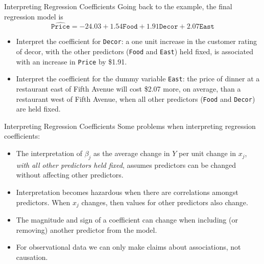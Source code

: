 \documentclass[10pt]{beamer}
\begin{document}
\begin{frame}{Interpreting Regression Coefficients}
Going back to the example, the final regression model is
$$\widehat{\texttt{Price}} = -24.03 + 1.54 \texttt{Food} + 1.91 \texttt{Decor} + 2.07\texttt{East}$$

\begin{itemize}
\item Interpret the coefficient for \texttt{Decor}: a one unit increase in the customer rating of decor, with the other predictors (\texttt{Food} and \texttt{East}) held fixed, is associated with an increase in \texttt{Price} by \$1.91.
\vspace{5pt}
\item Interpret the coefficient for the dummy variable \texttt{East}: the price of dinner at a restaurant east of Fifth Avenue will cost \$2.07 more, on average, than a restaurant west of Fifth Avenue, when all other predictors (\texttt{Food} and \texttt{Decor})  are held fixed.
\end{itemize}
\end{frame}


\begin{frame}{Interpreting Regression Coefficients}
Some problems when interpreting regression coefficients:
\vspace{5pt}
\begin{itemize}
\item The interpretation of $\beta_j$ as the average change in $Y$ per unit change in $x_j$, \emph{with all other predictors held fixed}, assumes predictors can be changed without affecting other predictors.
\vspace{5pt}
\item Interpretation becomes hazardous when there are correlations amongst predictors.  When $x_j$ changes, then values for other predictors also change. 
\vspace{5pt}
\item The magnitude and sign of a coefficient can change when including (or removing) another predictor from the model.
\vspace{5pt}
\item For observational data we can only make claims about associations, not causation.
\end{itemize}
\end{frame}
\end{document}
